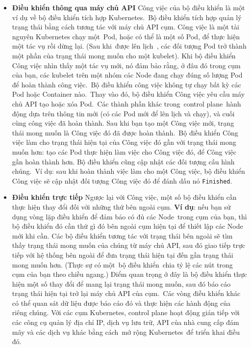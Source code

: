 \documentclass[12pt,a4paper]{report}
\begin{document}
	\begin{itemize}
		\item \textbf{Điều khiển thông qua máy chủ API}
		\smallskip
		\subitem Công việc của bộ điều khiển là một ví dụ về bộ điều khiển tích hợp Kubernetes. Bộ điều khiển tích hợp quản lý trạng thái bằng cách tương tác với máy chủ API cụm.
		\smallskip
		\subitem Công việc là một tài nguyên Kubernetes chạy một Pod, hoặc có thể là một số Pod, để thực hiện một tác vụ rồi dừng lại.
		\smallskip
		\subitem (Sau khi được lên lịch , các đối tượng Pod trở thành một phần của trạng thái mong muốn cho một kubelet).
		\smallskip
		\subitem Khi bộ điều khiển Công việc nhìn thấy một tác vụ mới, nó đảm bảo rằng, ở đâu đó trong cụm của bạn, các kubelet trên một nhóm các Node đang chạy đúng số lượng Pod để hoàn thành công việc. Bộ điều khiển công việc không tự chạy bất kỳ các Pod hoặc Container nào. Thay vào đó, bộ điều khiển Công việc yêu cầu máy chủ API tạo hoặc xóa Pod. Các thành phần khác trong control plane hành động dựa trên thông tin mới (có các Pod mới để lên lịch và chạy), và cuối cùng công việc đã hoàn thành.
		\smallskip
		\subitem Sau khi bạn tạo một Công việc mới, trạng thái mong muốn là Công việc đó đã được hoàn thành. Bộ điều khiển Công việc làm cho trạng thái hiện tại của Công việc đó gần với trạng thái mong muốn hơn: tạo các Pod thực hiện làm việc cho Công việc đó, để Công việc gần hoàn thành hơn.
		\smallskip
		\subitem Bộ điều khiển cũng cập nhật các đối tượng cấu hình chúng. Ví dụ: sau khi hoàn thành việc làm cho một Công việc, bộ điều khiển Công việc sẽ cập nhật đối tượng Công việc đó để đánh dấu nó \texttt{Finished}.
		
		\item \textbf{Điều khiển trực tiếp}
		\smallskip
		\subitem Ngược lại với Công việc, một số bộ điều khiển cần thực hiện thay đổi đối với những thứ bên ngoài cụm.
		\smallskip
		\subitem \textbf{Ví dụ}: nếu bạn sử dụng vòng lặp điều khiển để đảm bảo có đủ các Node trong cụm của bạn, thì bộ điều khiển đó cần thứ gì đó bên ngoài cụm hiện tại để thiết lập các Node mới khi cần.
		\smallskip
		\subitem Các bộ điều khiển tương tác với trạng thái bên ngoài sẽ tìm thấy trạng thái mong muốn của chúng từ máy chủ API, sau đó giao tiếp trực tiếp với hệ thống bên ngoài để đưa trạng thái hiện tại đến gần trạng thái mong muốn hơn.
		\smallskip
		\subitem (Thực sự có một bộ điều khiển chia tỷ lệ các nút trong cụm của bạn theo chiều ngang.)
		\smallskip
		\subitem Điểm quan trọng ở đây là bộ điều khiển thực hiện một số thay đổi để mang lại trạng thái mong muốn, sau đó báo cáo trạng thái hiện tại trở lại máy chủ API của cụm. Các vòng điều khiển khác có thể quan sát dữ liệu được báo cáo đó và thực hiện các hành động của riêng chúng.
		\smallskip
		\subitem Với các cụm Kubernetes, control plane hoạt động gián tiếp với các công cụ quản lý địa chỉ IP, dịch vụ lưu trữ, API của nhà cung cấp đám mây và các dịch vụ khác bằng cách mở rộng Kubernetes để triển khai điều đó.
	\end{itemize}
\end{document}
